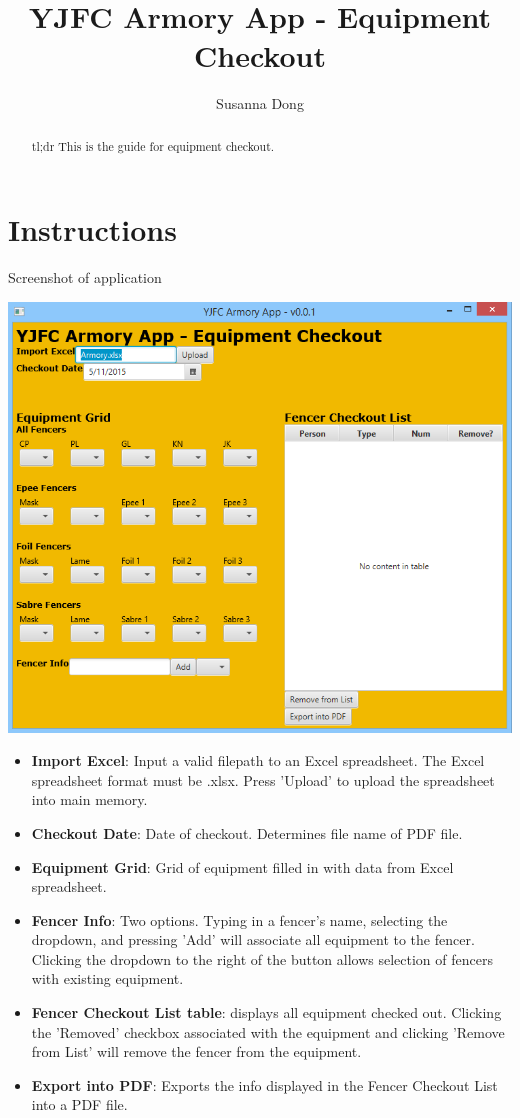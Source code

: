\documentclass[]{article}
\title{YJFC Armory App - Equipment Checkout}
\author{Susanna Dong}
\begin{document}
\maketitle

\begin{abstract}
tl;dr This is the guide for equipment checkout.
\end{abstract}

\section{Instructions}
Screenshot of application

\includegraphics[scale=0.7]{screen.png}

\begin{itemize}
\item \textbf{Import Excel}: Input a valid filepath to an Excel spreadsheet. The Excel spreadsheet format must be .xlsx. Press 'Upload' to upload the spreadsheet into main memory.

\item \textbf{Checkout Date}: Date of checkout. Determines file name of PDF file.

\item \textbf{Equipment Grid}: Grid of equipment filled in with data from Excel spreadsheet.

\item \textbf{Fencer Info}: Two options. Typing in a fencer's name, selecting the dropdown, and pressing 'Add' will associate all equipment to the fencer. Clicking the dropdown to the right of the button allows selection of fencers with existing equipment.

\item \textbf{Fencer Checkout List table}: displays all equipment checked out. Clicking the 'Removed' checkbox associated with the equipment and clicking 'Remove from List' will remove the fencer from the equipment.

\item \textbf{Export into PDF}: Exports the info displayed in the Fencer Checkout List into a PDF file.
\end{itemize}
\end{document}
